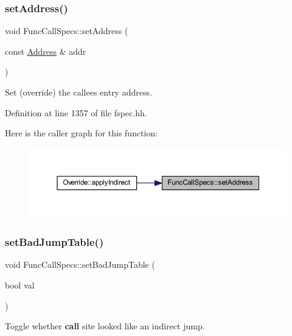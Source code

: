 \subsubsection{\texorpdfstring{setAddress()}{setAddress()}}
{\footnotesize\ttfamily void Func\+Call\+Specs\+::set\+Address (\begin{DoxyParamCaption}\item[{const \mbox{\hyperlink{class_address}{Address}} \&}]{addr }\end{DoxyParamCaption})\hspace{0.3cm}{\ttfamily [inline]}}



Set (override) the callee\textquotesingle{}s entry address. 



Definition at line 1357 of file fspec.\+hh.

Here is the caller graph for this function\+:
\nopagebreak
\begin{figure}[H]
\begin{center}
\leavevmode
\includegraphics[width=350pt]{class_func_call_specs_a9dbc2ae7d43e62971751d96cbddf1b32_icgraph}
\end{center}
\end{figure}
\mbox{\label{class_func_call_specs_abe07c5f01eaa2171a4d8c4c832910022}} 
\subsubsection{\texorpdfstring{setBadJumpTable()}{setBadJumpTable()}}
{\footnotesize\ttfamily void Func\+Call\+Specs\+::set\+Bad\+Jump\+Table (\begin{DoxyParamCaption}\item[{bool}]{val }\end{DoxyParamCaption})\hspace{0.3cm}{\ttfamily [inline]}}



Toggle whether {\bfseries{call}} site looked like an indirect jump. 




